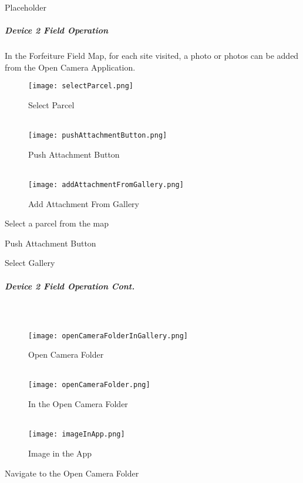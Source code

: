 \documentclass[class=article , crop=false, titlepage, twoside, multi={itemize, figure, verbatim}, float=false]{standalone}
\begin{document}
\noindent Placeholder\\

\clearpage
\subparagraph{Device 2 Field Operation}In the Forfeiture Field Map, for each site visited, a photo or photos can be added from the Open Camera Application.

\begin{wrapfigure}{r}{0.5\textwidth}
\centering
\texttt{[image: selectParcel.png]}
\caption {Select Parcel}
\vspace{.15in}
\HRule \\[.4cm] %
\vspace{.15in}
\texttt{[image: pushAttachmentButton.png]}
\caption{Push Attachment Button}
\vspace{.15in}
\HRule \\[.4cm] %
\vspace{.15in}
\texttt{[image: addAttachmentFromGallery.png]}
\caption{Add Attachment From Gallery}
\end{wrapfigure}
\vspace{.5in}

Select a parcel from the map\\
\vspace{2in}

\noindent Push Attachment Button
\vspace{2in}

\noindent Select Gallery

\clearpage
\subparagraph*{Device 2 Field Operation Cont.} 
\subparagraph*{\\}

\begin{wrapfigure}{r}{0.5\textwidth}
\centering
\texttt{[image: openCameraFolderInGallery.png]}
\caption {Open Camera Folder}
\vspace{.2in}
\HRule \\[.4cm] %
\vspace{.2in}
\texttt{[image: openCameraFolder.png]}
\caption{In the Open Camera Folder}
\vspace{.2in}
\HRule \\[.4cm] %
\vspace{.2in}
\texttt{[image: imageInApp.png]}
\caption{Image in the App}
\end{wrapfigure}
Navigate to the Open Camera Folder\\
\vspace{2in}
\end{document}
